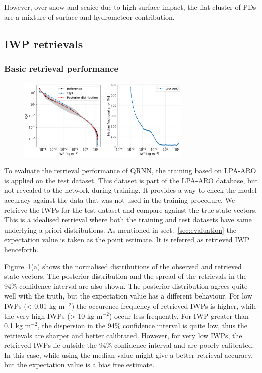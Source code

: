 \documentclass[amt, manuscript]{copernicus}
\begin{document}
However, over snow and seaice due to high surface impact, the flat cluster of PDs are a mixture of surface and hydrometeor contribution.
 


\subsection{IWP retrievals}
%
\subsubsection{Basic retrieval performance}
%
\label{sec:basic_performance}

\begin{figure}[t]
	\includegraphics[width=8.3cm]{Figures/PDF_IWP_ARO.pdf}
	\caption{}
	\label{fig:PDF_IWP_test}
\end{figure}

To evaluate the  retrieval performance of QRNN, the training based on LPA-ARO is applied on the test dataset. This dataset is part of the LPA-ARO database, but not revealed to the network during training. It provides a way to check the model accuracy against the data that was not used in the training procedure. We retrieve the IWPs for the test dataset and compare against the true state vectors. This is a idealised retrieval where both the training and test datasets have same underlying a priori distributions. As mentioned in sect.~\ref{sec:evaluation} the expectation value is taken as the point estimate. It is referred as retrieved IWP henceforth. 

Figure~\ref{fig:PDF_IWP_test}(a) shows the normalised distributions of the observed and retrieved state vectors. The posterior distribution and the spread of the retrievals in the 94\% confidence interval are also shown. The posterior distribution agrees quite well with the truth, but the expectation value has a different behaviour. For low IWPs (< 0.01\,\,kg m$^{-2}$) the occurence frequency of retrieved IWPs is higher, while the very high IWPs (> 10\,\,kg m$^{-2}$) occur less frequently. For IWP greater than 0.1\,\,kg m$^{-2}$, the dispersion in the 94\% confidence interval is quite low, thus the retrievals are  sharper and better calibrated. However, for very low IWPs, the retrieved IWPs lie outside the 94\% confidence interval and are poorly calibrated. In this case, while using the median value might give a better retrieval accuracy, but the expectation value is a bias free estimate. 
\end{document}
